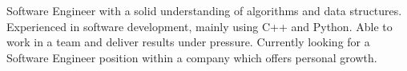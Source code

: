 
\begin{cventries}
    \cventryi
        {Software Engineer with a solid understanding of algorithms and data structures. Experienced in software development, mainly using C++ and Python. Able to work in a team and deliver results under pressure. Currently looking for a Software Engineer position within a company which offers personal growth.}
\end{cventries}
